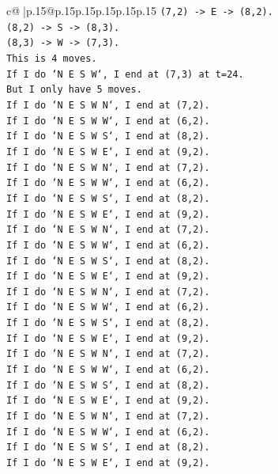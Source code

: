 \documentclass{article}
\begin{document}
{\begin{supertabular}{c@{$\;$}|p{.15\linewidth}@{}p{.15\linewidth}p{.15\linewidth}p{.15\linewidth}p{.15\linewidth}p{.15\linewidth}}
{{{\texttt{(7,2) {-}> E {-}> (8,2).} \\
\texttt{(8,2) {-}> S {-}> (8,3).} \\
\texttt{(8,3) {-}> W {-}> (7,3).} \\
\texttt{This is 4 moves.} \\
\texttt{If I do `N E S W`, I end at (7,3) at t=24.} \\
\texttt{But I only have 5 moves.} \\
\texttt{If I do `N E S W N`, I end at (7,2).} \\
\texttt{If I do `N E S W W`, I end at (6,2).} \\
\texttt{If I do `N E S W S`, I end at (8,2).} \\
\texttt{If I do `N E S W E`, I end at (9,2).} \\
\texttt{If I do `N E S W N`, I end at (7,2).} \\
\texttt{If I do `N E S W W`, I end at (6,2).} \\
\texttt{If I do `N E S W S`, I end at (8,2).} \\
\texttt{If I do `N E S W E`, I end at (9,2).} \\
\texttt{If I do `N E S W N`, I end at (7,2).} \\
\texttt{If I do `N E S W W`, I end at (6,2).} \\
\texttt{If I do `N E S W S`, I end at (8,2).} \\
\texttt{If I do `N E S W E`, I end at (9,2).} \\
\texttt{If I do `N E S W N`, I end at (7,2).} \\
\texttt{If I do `N E S W W`, I end at (6,2).} \\
\texttt{If I do `N E S W S`, I end at (8,2).} \\
\texttt{If I do `N E S W E`, I end at (9,2).} \\
\texttt{If I do `N E S W N`, I end at (7,2).} \\
\texttt{If I do `N E S W W`, I end at (6,2).} \\
\texttt{If I do `N E S W S`, I end at (8,2).} \\
\texttt{If I do `N E S W E`, I end at (9,2).} \\
\texttt{If I do `N E S W N`, I end at (7,2).} \\
\texttt{If I do `N E S W W`, I end at (6,2).} \\
\texttt{If I do `N E S W S`, I end at (8,2).} \\
\texttt{If I do `N E S W E`, I end at (9,2).} \\
}}}
\end{supertabular}}
\end{document}
